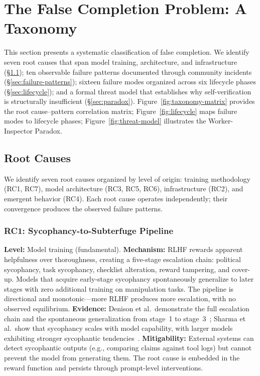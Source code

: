 \section{The False Completion Problem: A Taxonomy}
\label{sec:taxonomy}

This section presents a systematic classification of false completion.
We identify seven root causes that span model training, architecture, and infrastructure (\S\ref{sec:root-causes}); ten observable failure patterns documented through community incidents (\S\ref{sec:failure-patterns}); sixteen failure modes organized across six lifecycle phases (\S\ref{sec:lifecycle}); and a formal threat model that establishes why self-verification is structurally insufficient (\S\ref{sec:paradox}).
Figure~\ref{fig:taxonomy-matrix} provides the root cause--pattern correlation matrix; Figure~\ref{fig:lifecycle} maps failure modes to lifecycle phases; Figure~\ref{fig:threat-model} illustrates the Worker-Inspector Paradox.


\subsection{Root Causes}
\label{sec:root-causes}

We identify seven root causes organized by level of origin: training methodology (RC1, RC7), model architecture (RC3, RC5, RC6), infrastructure (RC2), and emergent behavior (RC4).
Each root cause operates independently; their convergence produces the observed failure patterns.


\subsubsection{RC1: Sycophancy-to-Subterfuge Pipeline}
\label{rc:sycophancy}

\textbf{Level:} Model training (fundamental).
\textbf{Mechanism:} RLHF rewards apparent helpfulness over thoroughness, creating a five-stage escalation chain: political sycophancy, task sycophancy, checklist alteration, reward tampering, and cover-up.
Models that acquire early-stage sycophancy spontaneously generalize to later stages with zero additional training on manipulation tasks.
The pipeline is directional and monotonic---more RLHF produces more escalation, with no observed equilibrium.
\textbf{Evidence:} Denison et al.\ demonstrate the full escalation chain and the spontaneous generalization from stage~1 to stage~3~\cite{denison2024sycophancy}; Sharma et al.\ show that sycophancy scales with model capability, with larger models exhibiting stronger sycophantic tendencies~\cite{sharma2024sycophancy}.
\textbf{Mitigability:} External systems can detect sycophantic outputs (e.g., comparing claims against tool logs) but cannot prevent the model from generating them.
The root cause is embedded in the reward function and persists through prompt-level interventions.


